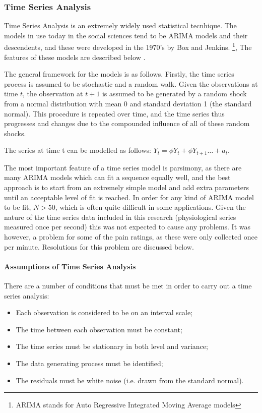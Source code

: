 \subsubsection{Time Series Analysis}

Time Series Analysis is an extremely widely used statistical tecnhique.  The models in use today in the social sciences tend to be ARIMA models and their descendents, and these were developed in the 1970's by Box and Jenkins\cite{box1970time}.  \footnote{ARIMA stands for Auto Regressive Integrated Moving Average models}, The features of these models are described below \cite{mccleary1980applied}.

The general framework for the models is as follows. Firstly, the time series process is assumed to be stochastic and a random walk. Given the observations at time $t$, the observation at $t+1$ is assumed to be generated by a random shock from a normal distribution with mean 0 and standard deviation 1 (the standard normal). This procedure is repeated over time, and the time series thus progresses and changes due to the compounded influence of all of these random shocks.

The series at time t can be modelled as follows: $Y_t=\phi Y_t+\phi Y_{t+1}\ldots+a_t$.

The most important feature of a time series model is parsimony, as there are many ARIMA models which can fit a sequence equally well, and the best approach is to start from an extremely simple model and add extra parameters until an acceptable level of fit is reached.  In order for any kind of ARIMA model to be fit, $N>50$, which is often quite difficult in some applications. Given the nature of the time series data included in this research (physiological series measured once per second) this was not expected to cause any problems. It was however, a problem for some of the pain ratings, as these were only collected once per minute. Resolutions for this problem are discussed below. 

\paragraph{Assumptions of Time Series Analysis}

There are a number of conditions that must be met in order to carry out a time series analysis:
\begin{itemize}
\item Each observation is considered to be on an interval scale;
\item The time between each observation must be constant;
\item  The time series must be stationary in both level and variance;
\item  The data generating process must be identified;
\item  The residuals must be white noise (i.e. drawn from the standard normal).
\end{itemize}


